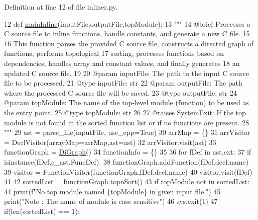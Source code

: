 Definition at line 12 of file inliner.\+py.


\begin{DoxyCode}
12 \textcolor{keyword}{def }\hyperlink{namespaceinliner_a85ff5417ce309a641abfa41d26e8d7f3}{mainInline}(inputFile,outputFile,topModule):
13     \textcolor{stringliteral}{"""
}
14 \textcolor{stringliteral}{    @brief Processes a C source file to inline functions, handle constants, and generate a new C file.
}
15 \textcolor{stringliteral}{
}
16 \textcolor{stringliteral}{    This function parses the provided C source file, constructs a directed graph of functions, performs
       topological
}
17 \textcolor{stringliteral}{    sorting, processes functions based on dependencies, handles array and constant values, and finally
       generates
}
18 \textcolor{stringliteral}{    an updated C source file.
}
19 \textcolor{stringliteral}{
}
20 \textcolor{stringliteral}{    @param inputFile: The path to the input C source file to be processed.
}
21 \textcolor{stringliteral}{    @type inputFile: str
}
22 \textcolor{stringliteral}{    @param outputFile: The path where the processed C source file will be saved.
}
23 \textcolor{stringliteral}{    @type outputFile: str
}
24 \textcolor{stringliteral}{    @param topModule: The name of the top-level module (function) to be used as the entry point.
}
25 \textcolor{stringliteral}{    @type topModule: str
}
26 \textcolor{stringliteral}{
}
27 \textcolor{stringliteral}{    @raises SystemExit: If the top module is not found in the sorted function list or if no functions are
       present.
}
28 \textcolor{stringliteral}{    """}
29     ast = parse\_file(inputFile, use\_cpp=\textcolor{keyword}{True})
30     arrMap = \{\}
31     arrVisitor = DeclVisitor(arrayMap=arrMap,ast=ast)
32     arrVisitor.visit(ast)
33     functionGraph = \hyperlink{namespaceDiGraph}{DiGraph}()
34     functionInfo = \{\}
35 
36     \textcolor{keywordflow}{for} fDef \textcolor{keywordflow}{in} ast.ext:
37         \textcolor{keywordflow}{if} isinstance(fDef,c\_ast.FuncDef):
38             functionGraph.addFunction(fDef.decl.name)
39             visitor = FunctionVisitor(functionGraph,fDef.decl.name)
40             visitor.visit(fDef)
41 
42     sortedList = functionGraph.topoSort()
43     \textcolor{keywordflow}{if} topModule \textcolor{keywordflow}{not} \textcolor{keywordflow}{in} sortedList:
44         print(f\textcolor{stringliteral}{"No top module named \{topModule\} in given input file."})
45         print(\textcolor{stringliteral}{"Note : The name of module is case sensitive"})
46         sys.exit(1)
47     if(len(sortedList) == 1):

\end{DoxyCode}
